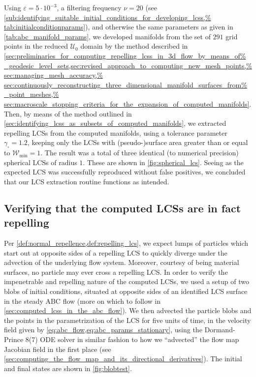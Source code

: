 

Using $\varepsilon=5\cdot10^{-3}$, a filtering frequency $\nu=20$ (see
\cref{sub:identifying_suitable_initial_conditions_for_developing_lcss,%
tab:initialconditionparams}), and otherwise the same parameters as given
in \cref{tab:abc_manifold_params}, we developed manifolds from the set
of $291$ grid points in the reduced $\mathcal{U}_{0}$ domain by the method
described in
\cref{sec:preliminaries_for_computing_repelling_lcss_in_3d_flow_by_means_of%
    _geodesic_level_sets,sec:revised_approach_to_computing_new_mesh_points,%
    sec:managing_mesh_accuracy,%
    sec:continuously_reconstructing_three_dimensional_manifold_surfaces_from%
    _point_meshes,%
    sec:macroscale_stopping_criteria_for_the_expansion_of_computed_manifolds}.
Then, by means of the method outlined in
\cref{sec:identifying_lcss_as_subsets_of_computed_manifolds}, we extracted
repelling LCSs from the computed manifolds, using a tolerance parameter
$\gamma_{\square}=1.2$, keeping only the LCSs with (pseudo-)surface area
greater than or equal to $\mathcal{W}_{\min}=1$. The result was a total of
three identical (to numerical precision) spherical LCSs of radius $1$. These
are shown in \cref{fig:spherical_lcs}. Seeing as the expected LCS was
successfully reproduced without false positives, we concluded that our LCS
extraction routine functions as intended.




\subsection{Verifying that the computed LCSs are in fact repelling}
\label{sub:verifying_that_the_computed_lcss_are_in_fact_repelling}

Per \cref{def:normal_repellence,def:repelling_lcs}, we expect lumps of
particles which start out at opposite sides of a repelling LCS to quickly
diverge under the advection of the underlying flow system. Moreover, courtesy
of being material surfaces, no particle may ever cross a repelling LCS. In
order to verify the impenetrable and repelling nature of the computed LCSs, we
used a setup of two blobs of initial conditions, situated at opposite sides of
an identified LCS surface in the steady ABC flow (more on which to follow in
\cref{sec:computed_lcss_in_the_abc_flow}). We then advected the particle blobs
and the points in the parametrization of the LCS for five units of time,
in the velocity field given by \cref{eq:abc_flow,eq:abc_params_stationary},
using the Dormand-Prince 8(7) ODE solver in similar fashion to how we
``advected'' the flow map Jacobian field in the first place
(see \cref{sec:computing_the_flow_map_and_its_directional_derivatives}).
The initial and final states are shown in \cref{fig:blobtest}.

